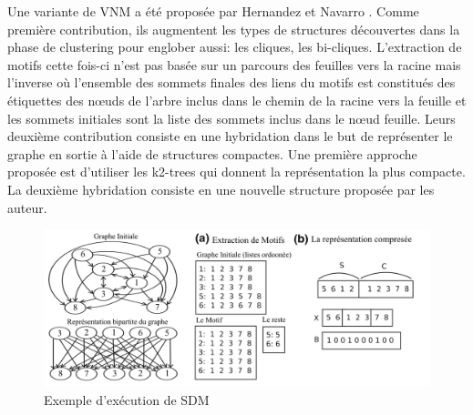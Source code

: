 \newpage	
	Une variante de VNM a été proposée par Hernandez et Navarro \citep{hernandez2014compressed}. Comme première contribution, ils augmentent les types de structures découvertes dans la phase de clustering pour englober aussi: les cliques, les bi-cliques. L'extraction de motifs cette fois-ci n'est pas basée sur un parcours des feuilles vers la racine mais l'inverse où  l'ensemble des sommets finales des liens du motifs est constitués des étiquettes des nœuds de l'arbre inclus dans le chemin de la racine vers la feuille et  les sommets initiales sont la liste des sommets inclus dans le nœud feuille. 
				Leurs deuxième contribution consiste en une hybridation dans le but de représenter le graphe en sortie à l'aide de structures compactes. Une première approche proposée est d'utiliser les  k2-trees \citep{brisaboa2009k}  qui donnent la représentation la plus compacte.  
				La deuxième hybridation consiste en une nouvelle structure proposée par les auteur.\\
				
				\begin{figure}[H]
					\includegraphics[scale=0.23]{ressources/image/VNM2_exemple.png} 
					\caption{Exemple d'exécution de SDM}
					\label{SDM}
				\end{figure}
			